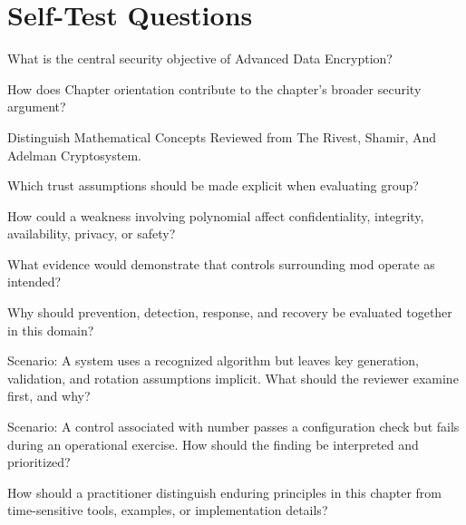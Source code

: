 \documentclass[11pt,letterpaper]{article}
\begin{document}
\section*{Self-Test Questions}
\begin{CornellRecallList}
\item What is the central security objective of Advanced Data Encryption?
\item How does Chapter orientation contribute to the chapter's broader security argument?
\item Distinguish Mathematical Concepts Reviewed from The Rivest, Shamir, And Adelman Cryptosystem.
\item Which trust assumptions should be made explicit when evaluating group?
\item How could a weakness involving polynomial affect confidentiality, integrity, availability, privacy, or safety?
\item What evidence would demonstrate that controls surrounding mod operate as intended?
\item Why should prevention, detection, response, and recovery be evaluated together in this domain?
\item Scenario: A system uses a recognized algorithm but leaves key generation, validation, and rotation assumptions implicit. What should the reviewer examine first, and why?
\item Scenario: A control associated with number passes a configuration check but fails during an operational exercise. How should the finding be interpreted and prioritized?
\item How should a practitioner distinguish enduring principles in this chapter from time-sensitive tools, examples, or implementation details?
\end{CornellRecallList}
\end{document}
